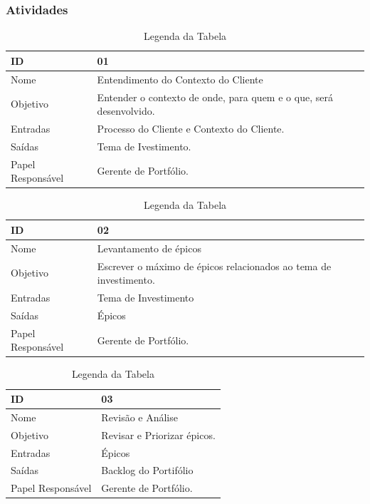 \subsubsection{Atividades}

  \begin{table}[H]
    \centering
      \begin{tabular}{| m{5em} | m{10cm} |}
        \hline
        ID       & 01   \\ \hline
        Nome     & Entendimento do Contexto do Cliente   \\ \hline
        Objetivo & Entender o contexto de onde, para quem e o que, será desenvolvido. \\ \hline
        Entradas & Processo do Cliente e Contexto do Cliente.   \\ \hline
        Saídas   & Tema de Ivestimento. \\ \hline
        Papel Responsável   & Gerente de Portfólio. \\ \hline
      \end{tabular}
      \caption{Legenda da Tabela}
      \label{tabela:atividade1}
  \end{table}

  \begin{table}[H]
    \centering
      \begin{tabular}{| m{5em} | m{10cm} |}
        \hline
        ID       & 02   \\ \hline
        Nome     & Levantamento de épicos   \\ \hline
        Objetivo & Escrever o máximo de épicos relacionados ao tema de investimento. \\ \hline
        Entradas & Tema de Investimento   \\ \hline
        Saídas   & Épicos \\ \hline
        Papel Responsável   & Gerente de Portfólio. \\ \hline
      \end{tabular}
      \caption{Legenda da Tabela}
      \label{tabela:atividade2}
  \end{table}

  \begin{table}[H]
    \centering
      \begin{tabular}{| m{5em} | m{10cm} |}
        \hline
        ID       & 03   \\ \hline
        Nome     & Revisão e Análise   \\ \hline
        Objetivo & Revisar e Priorizar épicos. \\ \hline
        Entradas & Épicos   \\ \hline
        Saídas   & Backlog do Portifólio \\ \hline
        Papel Responsável   & Gerente de Portfólio. \\ \hline
      \end{tabular}
      \caption{Legenda da Tabela}
      \label{tabela:atividade3}
  \end{table}

